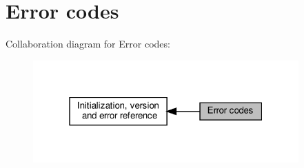 \hypertarget{group__errors}{}\section{Error codes}
\label{group__errors}
Collaboration diagram for Error codes\+:
\nopagebreak
\begin{figure}[H]
\begin{center}
\leavevmode
\includegraphics[width=289pt]{group__errors}
\end{center}
\end{figure}
